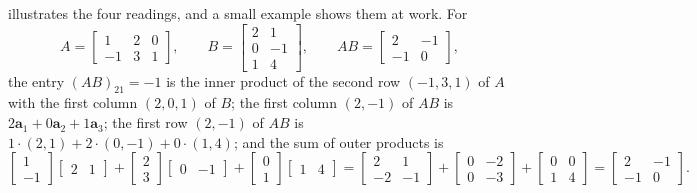  illustrates the four readings, and a small example shows them at work. For
\[
A=\begin{bmatrix}1&2&0\\-1&3&1\end{bmatrix},\qquad B=\begin{bmatrix}2&1\\0&-1\\1&4\end{bmatrix},\qquad AB=\begin{bmatrix}2&-1\\-1&0\end{bmatrix},
\]
the entry $(AB)_{21}=-1$ is the inner product of the second row $(-1,3,1)$ of $A$ with the first column $(2,0,1)$ of $B$; the first column $(2,-1)$ of $AB$ is $2\mathbf a_1+0\mathbf a_2+1\mathbf a_3$; the first row $(2,-1)$ of $AB$ is $1\cdot(2,1)+2\cdot(0,-1)+0\cdot(1,4)$; and the sum of outer products is
\[
\begin{bmatrix}1\\-1\end{bmatrix}\begin{bmatrix}2&1\end{bmatrix}+\begin{bmatrix}2\\3\end{bmatrix}\begin{bmatrix}0&-1\end{bmatrix}+\begin{bmatrix}0\\1\end{bmatrix}\begin{bmatrix}1&4\end{bmatrix}=\begin{bmatrix}2&1\\-2&-1\end{bmatrix}+\begin{bmatrix}0&-2\\0&-3\end{bmatrix}+\begin{bmatrix}0&0\\1&4\end{bmatrix}=\begin{bmatrix}2&-1\\-1&0\end{bmatrix}.
\]

